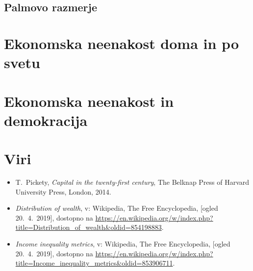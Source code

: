 \documentclass[a4paper,12 pt]{article}
\begin{document}
\subsection[Palmovo razmerje]{Palmovo razmerje}

\newpage

\section[Ekonomska neenakost doma in po svetu]{Ekonomska neenakost doma in po svetu}

\newpage

\section[Ekonomska neenakost in demokracija]{Ekonomska neenakost in demokracija}

\newpage

\section[Viri]{Viri}

\begin{itemize}
\item
\label{Pickety}
T.~Pickety, \emph{Capital in the twenty-first century}, The Belknap Press of Harvard University Press, London, 2014.

\item 
\label{Razdelitev premoženja}
\emph{Distribution of wealth}, v: Wikipedia, The Free Encyclopedia, [ogled 20.~4.~2019], dostopno na \url{https://en.wikipedia.org/w/index.php?title=Distribution_of_wealth&oldid=854198883}.

\item 
\label{Metrike ekonomske neenakosti}
\emph{Income inequality metrics}, v: Wikipedia, The Free Encyclopedia, [ogled 20.~4.~2019], dostopno na \url{https://en.wikipedia.org/w/index.php?title=Income_inequality_metrics&oldid=853906711}.
\end{itemize}
\end{document}
